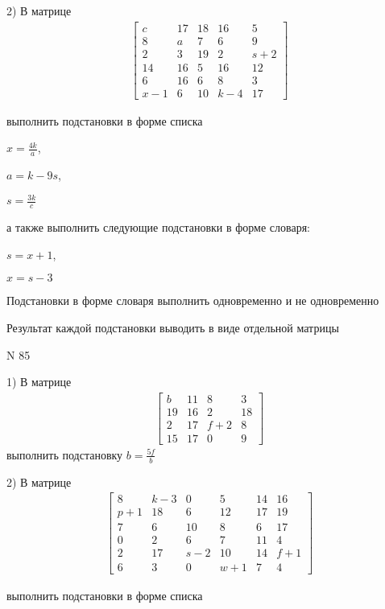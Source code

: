 \documentclass[11pt]{report}
\begin{document}
    2) В матрице
\begin{align*}
\left[\begin{matrix}c & 17 & 18 & 16 & 5\\8 & a & 7 & 6 & 9\\2 & 3 & 19 & 2 & s + 2\\14 & 16 & 5 & 16 & 12\\6 & 16 & 6 & 8 & 3\\x - 1 & 6 & 10 & k - 4 & 17\end{matrix}\right]
\end{align*}

выполнить подстановки в форме списка

$x=\frac{4 k}{a}$,

$a=k - 9 s$,

$s=\frac{3 k}{c}$

а также выполнить следующие подстановки в форме словаря:

$s=x + 1$,

$x=s - 3$


    Подстановки в форме словаря выполнить одновременно и не одновременно


    Результат каждой подстановки выводить в виде отдельной матрицы

\newpage
N 85


    1) В матрице
\begin{align*}
\left[\begin{matrix}b & 11 & 8 & 3\\19 & 16 & 2 & 18\\2 & 17 & f + 2 & 8\\15 & 17 & 0 & 9\end{matrix}\right]
\end{align*}
выполнить подстановку $b=\frac{5 f}{b}$


    2) В матрице
\begin{align*}
\left[\begin{matrix}8 & k - 3 & 0 & 5 & 14 & 16\\p + 1 & 18 & 6 & 12 & 17 & 19\\7 & 6 & 10 & 8 & 6 & 17\\0 & 2 & 6 & 7 & 11 & 4\\2 & 17 & s - 2 & 10 & 14 & f + 1\\6 & 3 & 0 & w + 1 & 7 & 4\end{matrix}\right]
\end{align*}

выполнить подстановки в форме списка
\end{document}

